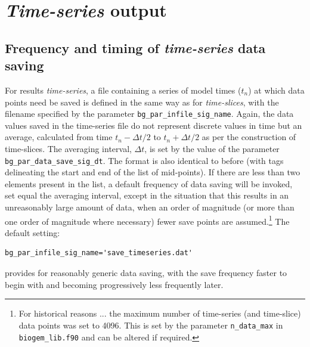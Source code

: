 \documentclass[11pt,fleqn]{book} %
\begin{document}

\newpage


\section{\textit{Time-series} output}


\subsection{Frequency and timing of \textit{time-series} data saving}

For results \textit{time-series}, a file containing a series of model times (\begin{math}t_{n}\end{math}) at which data points need be saved is defined in the same way as for \textit{time-slices}, with the filename specified by the parameter \texttt{bg\_par\_infile\_sig\_name}. Again, the data values saved in the time-series file do not represent discrete values in time but an average, calculated from time \begin{math}t_{n} - \Delta t/2\end{math} to \begin{math}t_{n} + \Delta t/2\end{math} as per the construction of time-slices. The averaging interval, \begin{math}\Delta t\end{math}, is set by the value of the parameter \texttt{bg\_par\_data\_save\_sig\_dt}. The format is also identical to before (with tags delineating the start and end of the list of mid-points). If there are less than two elements present in the list, a default frequency of data saving will be invoked, set equal the averaging interval, except in the situation that this results in an unreasonably large amount of data, when an order of magnitude (or more than one order of magnitude where necessary) fewer save points are assumed.\footnote{For historical reasons ... the maximum number of time-series (and time-slice) data points was set to 4096. This is set by the parameter \texttt{n\_data\_max} in \texttt{biogem\_lib.f90} and can be altered if required.} The default setting:
\small\begin{verbatim}bg_par_infile_sig_name='save_timeseries.dat'\end{verbatim}\normalsize
provides for reasonably generic data saving, with the save frequency faster to begin with and becoming progressively less frequently later.
\end{document}

